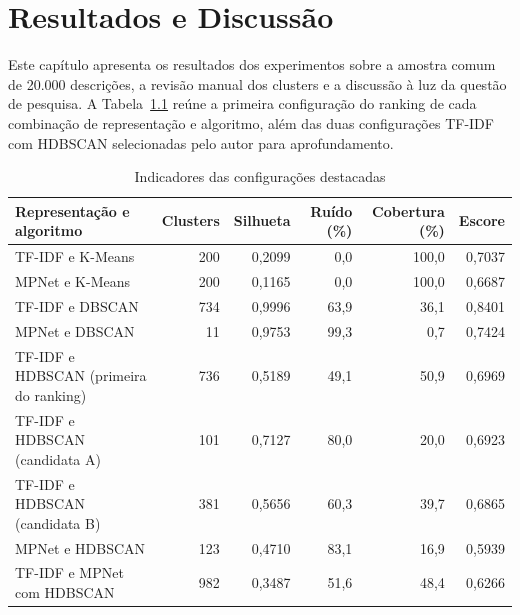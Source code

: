 \documentclass[english,brazilian]{UNISINOSmonografia}
\begin{document}
\chapter{Resultados e Discussão}
\label{cap:resultados}

Este capítulo apresenta os resultados dos experimentos sobre a amostra comum de 20.000 descrições, a revisão manual dos clusters e a discussão à luz da questão de pesquisa. A Tabela~\ref{tab:indicadores} reúne a primeira configuração do ranking de cada combinação de representação e algoritmo, além das duas configurações TF-IDF com HDBSCAN selecionadas pelo autor para aprofundamento.

\begin{table}[!htb]
    \caption{Indicadores das configurações destacadas}
    \label{tab:indicadores}
    \centering
    \small
    \begin{tabularx}{\textwidth}{Xrrrrr}
        \hline
        \textbf{Representação e algoritmo} & \textbf{Clusters} & \textbf{Silhueta} & \textbf{Ruído (\%)} & \textbf{Cobertura (\%)} & \textbf{Escore}\\
        \hline
        TF-IDF e K-Means & 200 & 0,2099 & 0,0 & 100,0 & 0,7037\\
        MPNet e K-Means & 200 & 0,1165 & 0,0 & 100,0 & 0,6687\\
        TF-IDF e DBSCAN & 734 & 0,9996 & 63,9 & 36,1 & 0,8401\\
        MPNet e DBSCAN & 11 & 0,9753 & 99,3 & 0,7 & 0,7424\\
        TF-IDF e HDBSCAN (primeira do ranking) & 736 & 0,5189 & 49,1 & 50,9 & 0,6969\\
        TF-IDF e HDBSCAN (candidata A) & 101 & 0,7127 & 80,0 & 20,0 & 0,6923\\
        TF-IDF e HDBSCAN (candidata B) & 381 & 0,5656 & 60,3 & 39,7 & 0,6865\\
        MPNet e HDBSCAN & 123 & 0,4710 & 83,1 & 16,9 & 0,5939\\
        TF-IDF e MPNet com HDBSCAN & 982 & 0,3487 & 51,6 & 48,4 & 0,6266\\
        \hline
    \end{tabularx}
\end{table}
\end{document}
